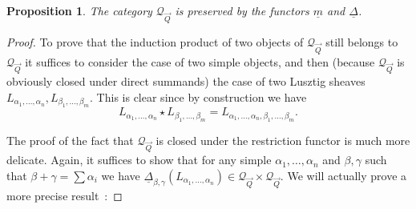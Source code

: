 \documentclass[a4paper,10pt]{amsart}
\def\a{\alpha}
\def\QQ{\mathcal{Q}_{\vec{Q}}}
\newtheorem{prop}[theo]{Proposition}
\numberwithin{equation}{section}
\begin{document}
\begin{prop}\label{P:closed} The category $\mathcal{Q}_{\vec{Q}}$ is preserved by the functors $\underline{m}$ and $\underline{\Delta}$.
\end{prop}
\begin{proof} To prove that the induction product of two objects of $\QQ$ still belongs to $\QQ$ it suffices to consider the case of two simple objects, and then (because $\QQ$ is obviously closed under direct summands) the case of two Lusztig sheaves $L_{\a_1, \ldots, \a_n}, L_{\beta_1, \ldots, \beta_m}$. This is clear since by construction we have
$$L_{\alpha_1, \ldots, \alpha_n} \star L_{\beta_1, \ldots, \beta_m}=L_{\a_1, \ldots, \a_n, \beta_1, \ldots, \beta_m}.$$

\vspace{.1in}

The proof of the fact that $\QQ$ is closed under the restriction functor is much more delicate. Again, it suffices to show that for any simple $\a_1, \ldots, \a_n$ and $\beta, \gamma$ such that $\beta+\gamma=\sum \a_i$ we have $\underline{\Delta}_{\beta, \gamma}(L_{\a_1, \ldots, \a_n}) \in \QQ \times \QQ.$ We will actually prove a more precise result~:

\vspace{.1in}


\end{proof}
\end{document}
